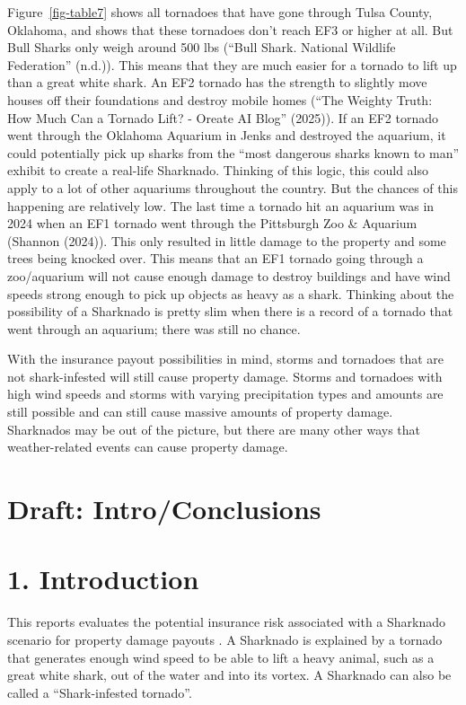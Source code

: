 \documentclass[
  letterpaper,
  DIV=11,
  numbers=noendperiod]{scrreprt}
\begin{document}
Figure~\ref{fig-table7} shows all tornadoes that have gone through Tulsa
County, Oklahoma, and shows that these tornadoes don't reach EF3 or
higher at all. But Bull Sharks only weigh around 500 lbs ({``Bull Shark.
National Wildlife Federation''} (n.d.)). This means that they are much
easier for a tornado to lift up than a great white shark. An EF2 tornado
has the strength to slightly move houses off their foundations and
destroy mobile homes ({``The Weighty Truth: How Much Can a Tornado Lift?
- Oreate {AI} Blog''} (2025)). If an EF2 tornado went through the
Oklahoma Aquarium in Jenks and destroyed the aquarium, it could
potentially pick up sharks from the ``most dangerous sharks known to
man'' exhibit to create a real-life Sharknado. Thinking of this logic,
this could also apply to a lot of other aquariums throughout the
country. But the chances of this happening are relatively low. The last
time a tornado hit an aquarium was in 2024 when an EF1 tornado went
through the Pittsburgh Zoo \& Aquarium (Shannon (2024)). This only
resulted in little damage to the property and some trees being knocked
over. This means that an EF1 tornado going through a zoo/aquarium will
not cause enough damage to destroy buildings and have wind speeds strong
enough to pick up objects as heavy as a shark. Thinking about the
possibility of a Sharknado is pretty slim when there is a record of a
tornado that went through an aquarium; there was still no chance.

With the insurance payout possibilities in mind, storms and tornadoes
that are not shark-infested will still cause property damage. Storms and
tornadoes with high wind speeds and storms with varying precipitation
types and amounts are still possible and can still cause massive amounts
of property damage. Sharknados may be out of the picture, but there are
many other ways that weather-related events can cause property damage.

\chapter{Draft: Intro/Conclusions}\label{draft-introconclusions}

\chapter{1. Introduction}\label{introduction-1}

This reports evaluates the potential insurance risk associated with a
Sharknado scenario for property damage payouts . A Sharknado is
explained by a tornado that generates enough wind speed to be able to
lift a heavy animal, such as a great white shark, out of the water and
into its vortex. A Sharknado can also be called a ``Shark-infested
tornado''.
\end{document}
